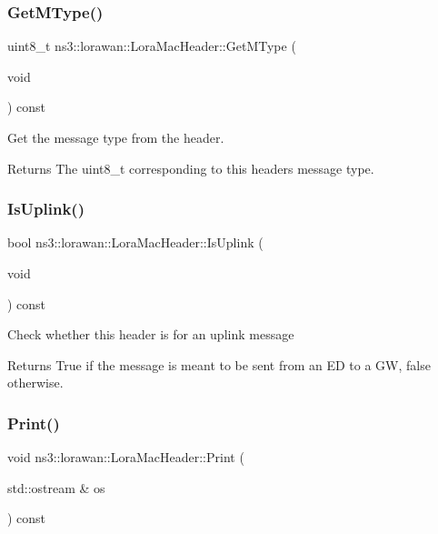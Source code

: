 \subsubsection{\texorpdfstring{Get\+M\+Type()}{GetMType()}}
{\footnotesize\ttfamily uint8\+\_\+t ns3\+::lorawan\+::\+Lora\+Mac\+Header\+::\+Get\+M\+Type (\begin{DoxyParamCaption}\item[{void}]{ }\end{DoxyParamCaption}) const}

Get the message type from the header.

\begin{DoxyReturn}{Returns}
The uint8\+\_\+t corresponding to this header\textquotesingle{}s message type. 
\end{DoxyReturn}
\mbox{\label{classns3_1_1lorawan_1_1LoraMacHeader_ac17b48b875ac5ed15ee7a863660cfa85}} 
\subsubsection{\texorpdfstring{Is\+Uplink()}{IsUplink()}}
{\footnotesize\ttfamily bool ns3\+::lorawan\+::\+Lora\+Mac\+Header\+::\+Is\+Uplink (\begin{DoxyParamCaption}\item[{void}]{ }\end{DoxyParamCaption}) const}

Check whether this header is for an uplink message

\begin{DoxyReturn}{Returns}
True if the message is meant to be sent from an ED to a GW, false otherwise. 
\end{DoxyReturn}
\mbox{\label{classns3_1_1lorawan_1_1LoraMacHeader_a848844d4bdf4c6978b3ee71f4189d917}} 
\subsubsection{\texorpdfstring{Print()}{Print()}}
{\footnotesize\ttfamily void ns3\+::lorawan\+::\+Lora\+Mac\+Header\+::\+Print (\begin{DoxyParamCaption}\item[{std\+::ostream \&}]{os }\end{DoxyParamCaption}) const\hspace{0.3cm}{\ttfamily [virtual]}}

